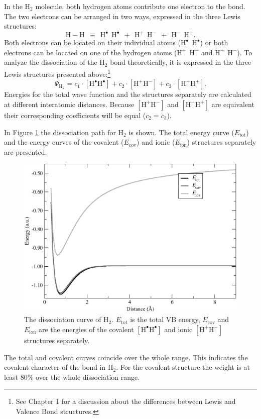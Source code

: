 In the H$_2$ molecule, both hydrogen atoms contribute one electron to the bond. The two electrons can be arranged in two ways, expressed in the three Lewis structures:
\begin{equation}
\nonumber
\mathrm{H-H\ \ \equiv \ \ H^{\bullet}\ \ H^{\bullet}\ \ +\ \ H^{+}\ \ H^{-}\ \ +\ \ H^{-}\ \ H^{+}}.
\end{equation}
Both electrons can be located on their individual atoms ($\mathrm{H^{\bullet}\ \ H^{\bullet}}$) or both electrons can be located on one of the hydrogen atoms ($\mathrm{H^{+}\ \ H^{-}}$ and $\mathrm{H^{+}\ \ H^{-}}$). To analyze the dissociation of the H$_2$ bond theoretically, it is expressed in the three Lewis structures presented above:\footnote{See Chapter 1 for a discussion about the differences between Lewis and Valence Bond structures.}
\begin{equation}
\nonumber
\Psi_{\mathrm{H_2}} = c_1\cdot [\mathrm{H}^\bullet \mathrm{H}^\bullet] + c_2 \cdot [\mathrm{H}^{+}\mathrm{H}^{-}] + c_3 \cdot [\mathrm{H}^{-}\mathrm{H}^{+}]. 
\end{equation}
Energies for the total wave function and the structures separately are calculated at different interatomic distances. Because $[\mathrm{H}^{+}\mathrm{H}^{-}]$ and $[\mathrm{H}^{-}\mathrm{H}^{+}]$ are equivalent their corresponding coefficients will be equal ($c_2 = c_3$).  

In Figure \ref{ch3.fig.h2_c} the dissociation path for H$_2$ is shown. The total energy curve ($E_\mathrm{tot}$) and the energy curves of the covalent ($E_\mathrm{cov}$) and ionic ($E_\mathrm{ion}$) structures separately are presented. 
\begin{figure}[hb]
\begin{center}
\includegraphics[scale=0.52]{dissociation/figures/h2_g.eps}
\end{center}
\caption{The dissociation curve of H$_2$. $E_\mathrm{tot}$ is the total VB energy, $E_\mathrm{cov}$  and $E_\mathrm{ion}$ are the energies of the covalent $[\mathrm{H^\bullet H^\bullet}]$ and ionic $[\mathrm{H^{+}H^{-}}]$ structures separately.}
\label{ch3.fig.h2_c}
\end{figure}
The total and covalent curves coincide over the whole range. This indicates the covalent character of the bond in H$_2$. For the covalent structure the weight is at least 80\% over the whole dissociation range.

